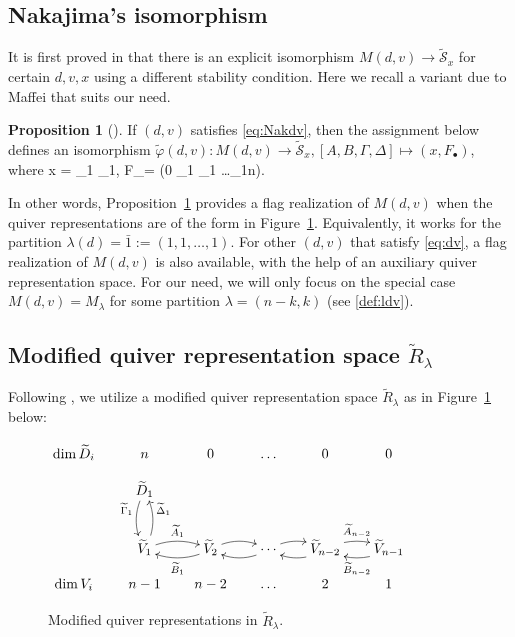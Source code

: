 \documentclass[11pt,reqno]{amsart}
\numberwithin{equation}{section}
\theoremstyle{definition}
\newtheorem{prop}[theorem]{Proposition}
\newcommand{\cS}{\mathcal{S}}
\newcommand{\ld}{\lambda}
\newcommand{\tA}{\widetilde{A}}
\newcommand{\tB}{\widetilde{B}}
\newcommand{\tcS}{\widetilde{\cS}}
\newcommand{\tD}{\widetilde{D}}
\newcommand{\tDe}{\widetilde{\Delta}}
\newcommand{\tGa}{\widetilde{\Gamma}}
\newcommand{\tphi}{\widetilde{\varphi}}
\newcommand{\tV}{\widetilde{V}}
\begin{document}
\subsection{Nakajima's isomorphism} 
It is first proved in \cite[Thm.~7.2]{Na94} that there is an explicit isomorphism $M(d,v) \to \tcS_x$ for certain $d,v,x$  using a different stability condition.
Here we recall a variant due to Maffei that suits our need. 
\begin{prop}[{\cite[Lemma~15]{Maf05}}]\label{prop:MS}
If $(d,v)$ satisfies \eqref{eq:Nakdv}, then the assignment below defines an isomorphism $\tphi(d,v): M(d, v) \to \tcS_x, [A, B, \Gamma, \Delta] \mapsto (x, F_\bullet)$, 
where
\eq
 x = \Delta_1 \Gamma_1,
 \quad
F_\bullet =  (0 \subset \ker\Gamma_1 
\subset \ker \Gamma_{1} 
\subset
\ldots \subset \ker \Gamma_{1\to n}).
\endeq
\end{prop}
In other words, Proposition~\ref{prop:MS} provides a flag realization of $M(d,v)$ when the quiver representations are of the form in Figure~\ref{figure:tS}.
Equivalently, it works for the partition $\ld(d) = \bar{1} := (1,1,\ldots, 1)$.
For other $(d,v)$ that satisfy \eqref{eq:dv},
a flag realization of $M(d,v)$ is also available, with the help of an auxiliary quiver representation space.
For our need, we will only focus on the special case $M(d,v) = M_\ld$ for some partition $\ld =(n-k,k)$ (see \eqref{def:ldv}). 
\subsection{Modified quiver representation space $\widetilde{R}_{\ld}$}
Following \cite{Maf05}, we utilize a modified quiver representation space $\widetilde{R}_{\ld}$ as in Figure~\ref{figure:tS} below:

\begin{figure}[ht!]
\caption{Modified quiver representations in $\widetilde{R}_{\ld}$.}
 \label{figure:tS}
\[ 
\xymatrix@C=18pt@R=9pt{
\dim \tD_i& n&0&\ldots&0&0
\\
&\ar@/_/[dd]_<(0.2){\tGa_1}
\tD_1
& &  &  &
\\ & & & & & & &  && 
\\ 
&
{\tV_1}  
	\ar@/_/[uu]_>(0.8){\tDe_1} 
	\ar@/^/[r]^{\tA_{1}}
	&   
	\ar@/^/[l]^{\tB_1}
{\tV_{2}}  
	\ar@/^/[r]
	& 
	\ar@/^/[l]
	\cdots
	\ar@/^/[r]
	&
	\ar@/^/[l]
{\tV_{n-2}}  
	\ar@/^/[r]^{\tA_{n-2}}
	& 
{\tV_{n-1}} 
\ar@/^/[l]^{\tB_{n-2}}  
\\
\dim V_i & n-1&n-2&\ldots&2&1
}
\] 
\end{figure}
\end{document}
